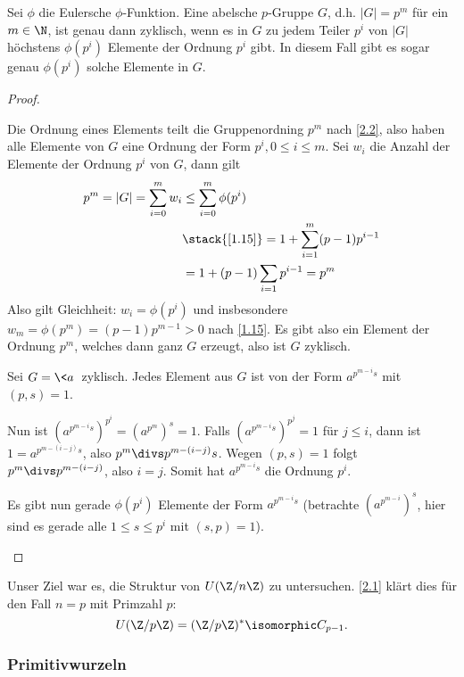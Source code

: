 \begin{lem} \label{2.6}
	Sei $\phi$ die Eulersche $\phi$-Funktion.
	Eine abelsche $p$-Gruppe $G$, d.h. $|G| = p^m$ für ein $m \in \N$, ist genau dann zyklisch, wenn es in $G$ zu jedem Teiler $p^i$ von $|G|$ höchstens $\phi(p^i)$ Elemente der Ordnung $p^i$ gibt.
	In diesem Fall gibt es sogar genau $\phi(p^i)$ solche Elemente in $G$.
	\begin{proof}
		\begin{seg}{\ProofImplication*}
			Die Ordnung eines Elements teilt die Gruppenordning $p^m$ nach \ref{2.2}, also haben alle Elemente von $G$ eine Ordnung der Form $p^i, 0 \le i \le m$.
			Sei $w_i$ die Anzahl der Elemente der Ordnung $p^i$ von $G$, dann gilt
			\begin{align*}
				p^m
				= |G|
				= \sum_{i=0}^m w_i
				&\le \sum_{i=0}^m \phi(p^i) \\
				&\stack{\ref{1.15}}= 1 + \sum_{i=1}^m (p-1)p^{i-1} \\
				&= 1 + (p-1)\sum_{i=1} p^{i-1}
				= p^m
			\end{align*}
			Also gilt Gleichheit: $w_i = \phi(p^i)$ und insbesondere $w_m = \phi(p^m) = (p-1)p^{m-1} > 0$ nach \ref{1.15}.
			Es gibt also ein Element der Ordnung $p^m$, welches dann ganz $G$ erzeugt, also ist $G$ zyklisch.
		\end{seg}
		\begin{seg}{\ProofImplication}
			Sei $G = \<a\>$ zyklisch.
			Jedes Element aus $G$ ist von der Form $a^{p^{m-i} s}$ mit $(p, s) = 1$.

			Nun ist $(a^{p^{m-i} s})^{p^i} = (a^{p^m})^s = 1$.
			Falls $(a^{p^{m-i} s})^{p^j} = 1$ für $j \le i$, dann ist $1 = a^{p^{m-(i-j)} s}$, also $p^m \divs p^{m-(i-j)} s$.
			Wegen $(p, s) = 1$ folgt $p^m \divs p^{m-(i-j)}$, also $i = j$.
			Somit hat $a^{p^{m-i} s}$ die Ordnung $p^i$.

			Es gibt nun gerade $\phi(p^i)$ Elemente der Form $a^{p^{m-i} s}$ (betrachte $(a^{p^{m-i}})^s$, hier sind es gerade alle $1 \le s \le p^i$ mit $(s, p) = 1$).
		\end{seg}
	\end{proof}
\end{lem}


Unser Ziel war es, die Struktur von $U(\Z / n \Z)$ zu untersuchen.
\ref{2.1} klärt dies für den Fall $n = p$ mit Primzahl $p$:
\[
	U(\Z / p \Z) = (\Z / p \Z)^* \isomorphic C_{p-1}.
\]

\subsubsection{Primitivwurzeln}

